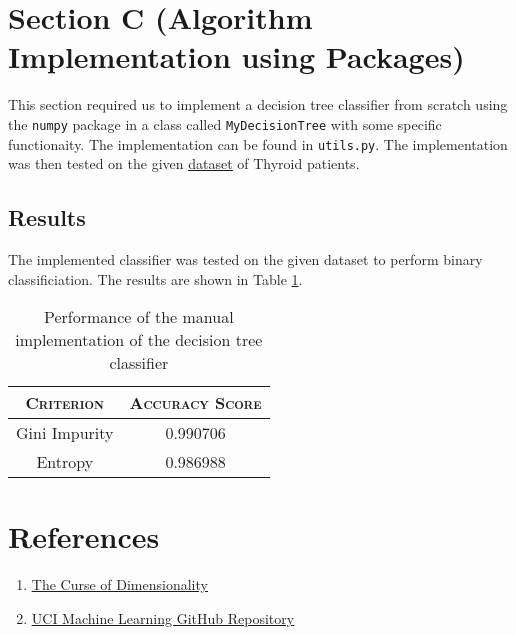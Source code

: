 \documentclass[12pt]{article}
\begin{document}
    \section{Section C (Algorithm Implementation using Packages)}
    This section required us to implement a decision tree classifier from scratch using the
    \texttt{numpy} package in a class called \texttt{MyDecisionTree} with some specific functionaity.
    The implementation can be found in \texttt{utils.py}. The implementation was then tested on the
    given \href{https://docs.google.com/spreadsheets/d/1BBvBLlzh39z-UdwVkIL57J9sxEUZ-nwsPUImTXlx9Go/edit##gid=0}{\color{blue}\underline{dataset}} of Thyroid patients.

    \subsection*{Results}
    The implemented classifier was tested on the given dataset to perform binary classificiation. The results are shown in Table \ref{tab:results}.
    \begin{table}[htbp]
        \centering
        \begin{tabular}{c|c}
            \textsc{Criterion} & \textsc{Accuracy Score} \\
            \hline
            Gini Impurity & 0.990706 \\
            Entropy & 0.986988
        \end{tabular}
        \caption{Performance of the manual implementation of the decision tree classifier}
        \label{tab:results}
    \end{table}

    \section*{References}
    \begin{enumerate}
        \item \href{https://towardsdatascience.com/curse-of-dimensionality-a-curse-to-machine-learning-c122ee33bfeb}{\color{blue}\underline{The Curse of Dimensionality}}
        \item \href{https://github.com/uci-ml-repo/ucimlrepo}{\color{blue}\underline{UCI Machine Learning GitHub Repository}}
    \end{enumerate}
\end{document}
